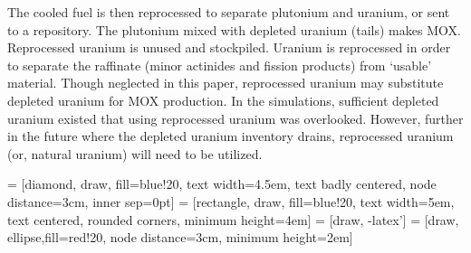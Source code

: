 The cooled fuel is then reprocessed to separate plutonium and uranium,
or sent to a repository.
The plutonium mixed with depleted uranium (tails) makes \gls{MOX}.
Reprocessed uranium is unused and stockpiled. Uranium is reprocessed
in order to separate the raffinate (minor actinides and fission products)
from `usable' material. Though neglected in this paper, reprocessed
uranium may substitute depleted uranium for \gls{MOX} production. In the
simulations, sufficient depleted uranium existed that using reprocessed
uranium was overlooked. However, further in the future where the depleted
uranium inventory drains, reprocessed uranium (or, natural uranium) will need to be utilized. 


 = [diamond, draw, fill=blue!20, 
text width=4.5em, text badly centered, node distance=3cm, inner sep=0pt]
 = [rectangle, draw, fill=blue!20, 
text width=5em, text centered, rounded corners, minimum height=4em]
 = [draw, -latex']
 = [draw, ellipse,fill=red!20, node distance=3cm,
minimum height=2em]


